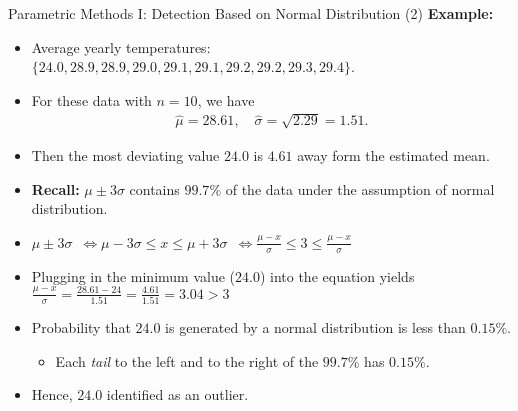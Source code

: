 \begin{frame}{Parametric Methods I: Detection Based on Normal Distribution (2)}
	\textbf{Example:}
	\begin{itemize}
		\item Average yearly temperatures: $\{24.0, 28.9, 28.9, 29.0, 29.1, 29.1, 29.2, 29.2, 29.3, 29.4\}$.
		\item For these data with $n = 10$, we have
		      \begin{align*}
			      \widehat{\mu}=28.61, \quad \widehat{\sigma}=\sqrt{2.29}=1.51.
		      \end{align*}
		\item Then the most deviating value $24.0$ is $4.61$ away form the estimated mean.
		\item \textbf{Recall:} $\mu \pm 3\sigma $ contains $99.7\%$ of the data under the assumption of normal distribution.
		\item $\mu \pm 3\sigma$\pause~$ \Leftrightarrow \mu - 3\sigma \leq x \le \mu + 3\sigma$\pause~$ \Leftrightarrow \frac{\mu - x}{\sigma} \leq 3 \leq \frac{\mu - x}{\sigma}$
		\item Plugging in the minimum value ($24.0$) into the equation yields $\frac{\mu-x}{\sigma} = \frac{28.61 - 24}{1.51} =\frac{4.61}{1.51}  =  3.04  >  3$
		\item Probability that $24.0$ is generated by a normal distribution is less than $0.15\%$.
		      \begin{itemize}
			      \item Each \emph{tail} to the left and to the right of the $99.7\%$ has $0.15\%$.
		      \end{itemize}
		\item Hence, $24.0$ identified as an outlier.
	\end{itemize}
\end{frame}


